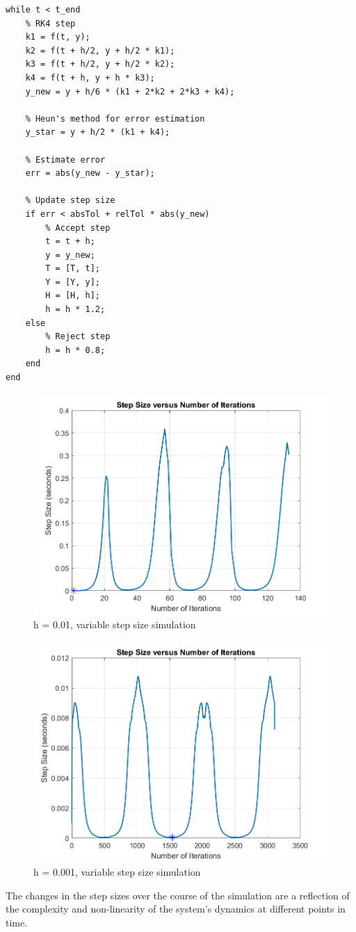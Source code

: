 \documentclass[12pt]{report}
\begin{document}
\begin{lstlisting}
while t < t_end
    % RK4 step
    k1 = f(t, y);
    k2 = f(t + h/2, y + h/2 * k1);
    k3 = f(t + h/2, y + h/2 * k2);
    k4 = f(t + h, y + h * k3);
    y_new = y + h/6 * (k1 + 2*k2 + 2*k3 + k4);

    % Heun's method for error estimation
    y_star = y + h/2 * (k1 + k4);

    % Estimate error
    err = abs(y_new - y_star);

    % Update step size
    if err < absTol + relTol * abs(y_new)
        % Accept step
        t = t + h;
        y = y_new;
        T = [T, t];
        Y = [Y, y];
        H = [H, h];
        h = h * 1.2;
    else
        % Reject step
        h = h * 0.8;
    end
end
\end{lstlisting}
\FloatBarrier
\begin{figure}
    \centering
    \includegraphics[width = 0.8 \textwidth]{variable (1).png}
    \caption{h = 0.01, variable step size simulation}
\end{figure}

\begin{figure}
    \centering
    \includegraphics[width = 0.8 \textwidth]{Figure_1.png}
    \caption{h = 0.001, variable step size simulation}
\end{figure}
\FloatBarrier
The changes in the step sizes over the course of the simulation are a reflection of the complexity and non-linearity of the system's dynamics at different points in time.
\end{document}
